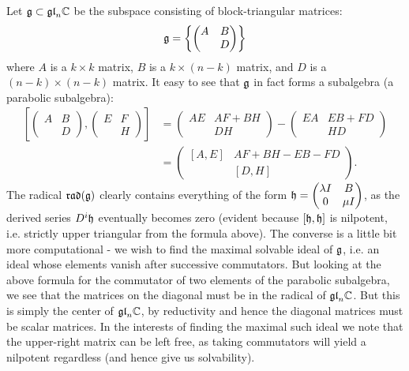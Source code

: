 \documentclass{../../mathnotes}
\begin{document}
Let $\mathfrak g\subset \mathfrak{gl}_n\mathbb{C}$ be the subspace consisting of block-triangular matrices:
\[\mathfrak g=\left\{ \begin{pmatrix}A&B\\&D\end{pmatrix}\right\}\]
where $A$ is a $k\times k$ matrix, $B$ is a $k\times(n-k)$ matrix, and $D$ is a $(n-k)\times(n-k)$ matrix.
It easy to see that $\mathfrak g$ in fact forms a subalgebra (a parabolic subalgebra):
\begin{align*}
    \left[
    \begin{pmatrix}
        A&B\\&D
    \end{pmatrix},
    \begin{pmatrix}
        E&F\\&H
    \end{pmatrix}
    \right]&=
    \begin{pmatrix}
        AE&AF+BH\\&DH
    \end{pmatrix}
    -
    \begin{pmatrix}
        EA&EB+FD\\&HD
    \end{pmatrix}\\
    &=
    \begin{pmatrix}
        [A,E]&AF+BH-EB-FD\\&[D,H]
    \end{pmatrix}.
\end{align*}
The radical $\mathfrak{rad}(\mathfrak g)$ clearly contains everything of the form $\mathfrak h=\begin{pmatrix}\lambda I&B\\0&\mu I \end{pmatrix}$, as the derived
series $D^i\mathfrak h$ eventually becomes zero (evident because $[\mathfrak h,\mathfrak h]$ is nilpotent, i.e. strictly upper triangular from the formula above).
The converse is a little bit more computational - we wish to find the maximal solvable ideal of $\mathfrak g$, i.e. an ideal whose
elements vanish after successive commutators. But looking at the above formula for the commutator of two elements of the parabolic subalgebra,
we see that the matrices on the diagonal must be in the radical of $\mathfrak{gl}_n\mathbb{C}$. But this is simply the center of $\mathfrak{gl}_n\mathbb{C}$, by reductivity
and hence the diagonal matrices must be scalar matrices. In the interests of finding the maximal such ideal we note that the upper-right matrix
can be left free, as taking commutators will yield a nilpotent regardless (and hence give us solvability).
\end{document}
